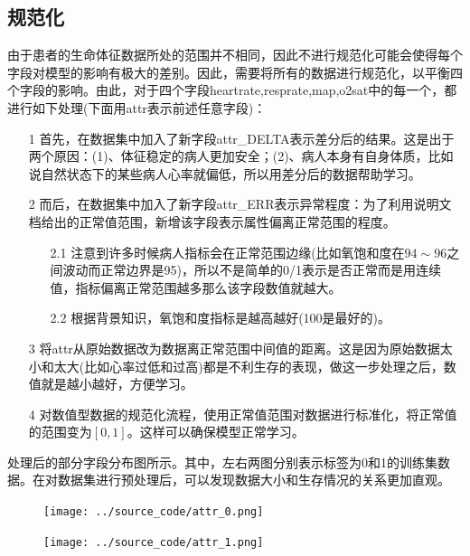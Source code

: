 \documentclass[UTF8]{article}
\begin{document}
\subsection{规范化}
由于患者的生命体征数据所处的范围并不相同，因此不进行规范化可能会使得每个字段对模型的影响有极大的差别。因此，需要将所有的数据进行规范化，以平衡四个字段的影响。由此，对于四个字段heartrate,resprate,map,o2sat中的每一个，都进行如下处理(下面用attr表示前述任意字段)：

\begin{enumerate}
    \item[1] 首先，在数据集中加入了新字段attr\_DELTA表示差分后的结果。这是出于两个原因：(1)、体征稳定的病人更加安全；(2)、病人本身有自身体质，比如说自然状态下的某些病人心率就偏低，所以用差分后的数据帮助学习。
    \item[2] 而后，在数据集中加入了新字段attr\_ERR表示异常程度：为了利用说明文档给出的正常值范围，新增该字段表示属性偏离正常范围的程度。
        \begin{enumerate}
            \item[2.1] 注意到许多时候病人指标会在正常范围边缘(比如氧饱和度在$94\sim96$之间波动而正常边界是95)，所以不是简单的0/1表示是否正常而是用连续值，指标偏离正常范围越多那么该字段数值就越大。
            \item[2.2] 根据背景知识，氧饱和度指标是越高越好(100是最好的)。
        \end{enumerate}
    \item[3] 将attr从原始数据改为数据离正常范围中间值的距离。这是因为原始数据太小和太大(比如心率过低和过高)都是不利生存的表现，做这一步处理之后，数值就是越小越好，方便学习。
    \item[4] 对数值型数据的规范化流程，使用正常值范围对数据进行标准化，将正常值的范围变为$[0,1]$。这样可以确保模型正常学习。
\end{enumerate}

处理后的部分字段分布图所示。其中，左右两图分别表示标签为0和1的训练集数据。在对数据集进行预处理后，可以发现数据大小和生存情况的关系更加直观。

\begin{figure}[h]
    \centering
    \begin{minipage}{.43\linewidth}
        \centering
        \texttt{[image: ../source\_code/attr\_0.png]}
    \end{minipage}
    \begin{minipage}{.43\linewidth}
        \centering
        \texttt{[image: ../source\_code/attr\_1.png]}
    \end{minipage}
\end{figure}
\end{document}
